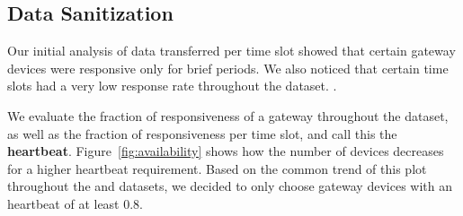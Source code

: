 \subsection{Data Sanitization}
\label{subsec:data-sanitization}

Our initial analysis of data transferred per time slot showed that certain 
gateway devices were responsive only for brief periods. We also noticed that 
certain time slots had a very low response rate throughout the dataset. 
.

We evaluate the fraction of responsiveness of a gateway throughout the dataset, 
as well as the fraction of responsiveness per time slot, and call this the 
\textbf{heartbeat}. Figure~\ref{fig:availability} shows how the number of 
devices decreases for a higher heartbeat requirement. Based on the common 
trend of this plot throughout the \test and \control datasets, we decided to 
only choose gateway devices with an heartbeat of at least 0.8. 


